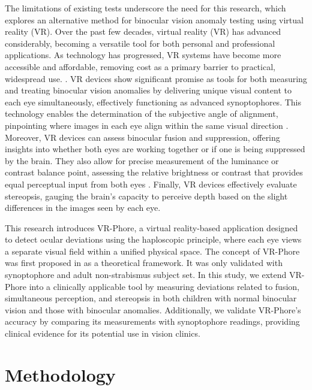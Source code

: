 \documentclass{article}
\begin{document}
The limitations of existing tests underscore the need for this research, which explores an alternative method for binocular vision anomaly testing using virtual reality (VR). Over the past few decades, virtual reality (VR) has advanced considerably, becoming a versatile tool for both personal and professional applications. As technology has progressed, VR systems have become more accessible and affordable, removing cost as a primary barrier to practical, widespread use. \cite{vrhealth}. VR devices show significant promise as tools for both measuring and treating binocular vision anomalies by delivering unique visual content to each eye simultaneously, effectively functioning as advanced synoptophores. This technology enables the determination of the subjective angle of alignment, pinpointing where images in each eye align within the same visual direction \cite{Levi}. Moreover, VR devices can assess binocular fusion and suppression, offering insights into whether both eyes are working together or if one is being suppressed by the brain. They also allow for precise measurement of the luminance or contrast balance point, assessing the relative brightness or contrast that provides equal perceptual input from both eyes \cite{Levi}. Finally, VR devices effectively evaluate stereopsis, gauging the brain's capacity to perceive depth based on the slight differences in the images seen by each eye. 

This research introduces VR-Phore, a virtual reality-based application designed to detect ocular deviations using the haploscopic principle, where each eye views a separate visual field within a unified physical space. The concept of VR-Phore was first proposed in \cite{vrphore} as a theoretical framework. It was only validated with synoptophore and adult non-strabismus subject set. In this study, we extend VR-Phore into a clinically applicable tool by measuring deviations related to fusion, simultaneous perception, and stereopsis in both children with normal binocular vision and those with binocular anomalies. Additionally, we validate VR-Phore’s accuracy by comparing its measurements with synoptophore readings, providing clinical evidence for its potential use in vision clinics.


\section{Methodology}
\end{document}
